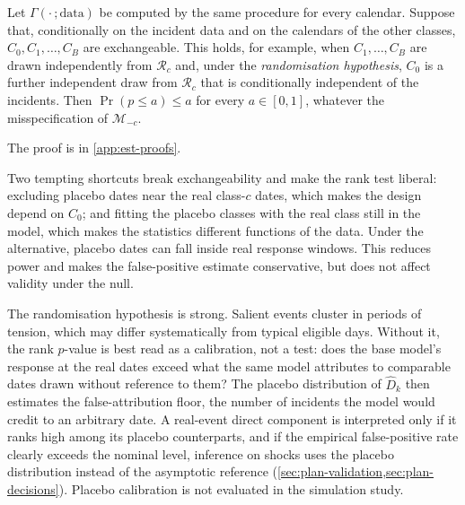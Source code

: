 \begin{lemma}\label{lem:est-placebo}
Let $\Gamma(\cdot\,;\text{data})$ be computed by the same procedure for every calendar. Suppose that, conditionally on the incident data and on the calendars of the
other classes, $C_0,C_1,\dots,C_B$ are exchangeable. This holds, for example, when
$C_1,\dots,C_B$ are drawn independently from $\mathcal R_c$ and, under the
\emph{randomisation hypothesis}, $C_0$ is a further independent draw from $\mathcal R_c$
that is conditionally independent of the incidents. Then $\Pr(p\le a)\le a$ for every
$a\in[0,1]$, whatever the misspecification of $\mathcal M_{-c}$.
\end{lemma}

The proof is in \cref{app:est-proofs}.

Two tempting shortcuts break exchangeability and make the rank test liberal: excluding
placebo dates near the real class-$c$ dates, which makes the design depend on $C_0$; and
fitting the placebo classes with the real class still in the model, which makes the
statistics different functions of the data. Under the alternative, placebo dates can fall
inside real response windows. This reduces power and makes the false-positive estimate
conservative, but does not affect validity under the null.

The randomisation hypothesis is strong. Salient events cluster in periods of tension, which
may differ systematically from typical eligible days. Without it, the rank $p$-value is
best read as a calibration, not a test: does the base model's response at the real dates
exceed what the same model attributes to comparable dates drawn without reference to them?
The placebo distribution of $\hat D_k$ then estimates the false-attribution floor, the
number of incidents the model would credit to an arbitrary date. A real-event direct
component is interpreted only if it ranks high among its placebo counterparts, and if the
empirical false-positive rate clearly exceeds the nominal level, inference on shocks uses
the placebo distribution instead of the asymptotic reference
(\cref{sec:plan-validation,sec:plan-decisions}). Placebo calibration is not evaluated in
the simulation study.
